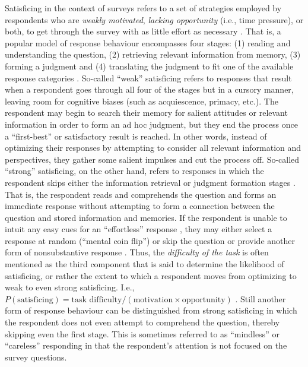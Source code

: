 \documentclass[Royal,times,sageh]{sagej}
\begin{document}
Satisficing \citep{Krosnick1991, Roberts2019} in the context of surveys
refers to a set of strategies employed by respondents who are
\emph{weakly motivated}, \emph{lacking opportunity} (i.e., time
pressure), or both, to get through the survey with as little effort as
necessary \citep{Krosnick1991, Roberts2019}. That is, a popular model of
response behaviour encompasses four stages: (1) reading and
understanding the question, (2) retrieving relevant information from
memory, (3) forming a judgment and (4) translating the judgment to fit
one of the available response categories
\citep{Roberts2019, Tourangeau2000}. So-called ``weak'' satisficing
refers to responses that result when a respondent goes through all four
of the stages but in a cursory manner, leaving room for cognitive biases
(such as acquiescence, primacy, etc.). The respondent may begin to
search their memory for salient attitudes or relevant information in
order to form an ad hoc judgment, but they end the process once a
``first-best'' or satisfactory result is reached. In other words,
instead of optimizing their responses by attempting to consider all
relevant information and perspectives, they gather some salient impulses
and cut the process off. So-called ``strong'' satisficing, on the other
hand, refers to responses in which the respondent skips either the
information retrieval or judgment formation stages \citep{Vannette2014}.
That is, the respondent reads and comprehends the question and forms an
immediate response without attempting to form a connection between the
question and stored information and memories. If the respondent is
unable to intuit any easy cues for an ``effortless'' response
\citep{Roberts2019, Leiner2019}, they may either select a response at
random (``mental coin flip'') or skip the question or provide another
form of nonsubstantive response \citep[e.g., ``don't
know'',][]{Vannette2014}. Thus, the \emph{difficulty of the task} is
often mentioned as the third component that is said to determine the
likelihood of satisficing, or rather the extent to which a respondent
moves from optimizing to weak to even strong satisficing. I.e.,
\(P(\text{satisficing}) = \text{task difficulty}/(\text{motivation} \times \text{opportunity})\)
\citep{Roberts2019}. Still another form of response behaviour can be
distinguished from strong satisficing in which the respondent does not
even attempt to comprehend the question, thereby skipping even the first
stage. This is sometimes referred to as ``mindless''
\citep{Vannette2014} or ``careless'' \citep{Leiner2019} responding in
that the respondent's attention is not focused on the survey questions.
\end{document}
